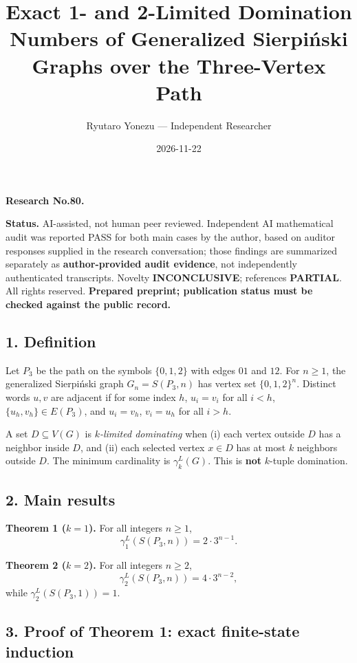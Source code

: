 \documentclass[
  11pt,
]{article}
\title{Exact 1- and 2-Limited Domination Numbers of Generalized
Sierpiński Graphs over the Three-Vertex Path}
\author{Ryutaro Yonezu --- Independent Researcher}
\date{2026-11-22}
\begin{document}
\maketitle

\textbf{Research No.80.}

\textbf{Status.} AI-assisted, not human peer reviewed. Independent AI
mathematical audit was reported PASS for both main cases by the author,
based on auditor responses supplied in the research conversation; those
findings are summarized separately as \textbf{author-provided audit
evidence}, not independently authenticated transcripts. Novelty
\textbf{INCONCLUSIVE}; references \textbf{PARTIAL}. All rights reserved.
\textbf{Prepared preprint; publication status must be checked against
the public record.}

\subsection{1. Definition}\label{definition}

Let \(P_3\) be the path on the symbols \(\{0,1,2\}\) with edges \(01\)
and \(12\). For \(n\ge1\), the generalized Sierpiński graph
\(G_n=S(P_3,n)\) has vertex set \(\{0,1,2\}^n\). Distinct words \(u,v\)
are adjacent if for some index \(h\), \(u_i=v_i\) for all \(i<h\),
\(\{u_h,v_h\}\in E(P_3)\), and \(u_i=v_h\), \(v_i=u_h\) for all \(i>h\).

A set \(D\subseteq V(G)\) is \emph{\(k\)-limited dominating} when (i)
each vertex outside \(D\) has a neighbor inside \(D\), and (ii) each
selected vertex \(x\in D\) has at most \(k\) neighbors outside \(D\).
The minimum cardinality is \(\gamma_k^L(G)\). This is \textbf{not}
\(k\)-tuple domination.

\subsection{2. Main results}\label{main-results}

\textbf{Theorem 1 (\(k=1\)).} For all integers \(n\ge1\),
\[\gamma_1^L(S(P_3,n))=2\cdot 3^{n-1}.\]

\textbf{Theorem 2 (\(k=2\)).} For all integers \(n\ge2\),
\[\gamma_2^L(S(P_3,n))=4\cdot 3^{n-2},\] while
\(\gamma_2^L(S(P_3,1))=1\).

\subsection{3. Proof of Theorem 1: exact finite-state
induction}\label{proof-of-theorem-1-exact-finite-state-induction}
\end{document}

